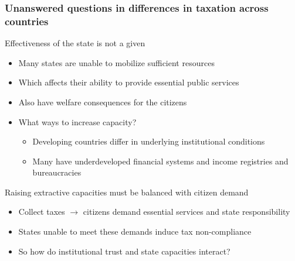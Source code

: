 \documentclass[aspectratio=169]{beamer}
\begin{document}
\begin{frame}
\frametitle{Unanswered questions in differences in taxation across countries}
Effectiveness of the state is not a given
\begin{itemize}\setlength\itemsep{3pt}
\item Many states are unable to mobilize sufficient resources
\item Which affects their ability to provide essential public services
\item Also have welfare consequences for the citizens
\item What ways to increase capacity?
\begin{itemize}\setlength\itemsep{3pt}
\item Developing countries differ in underlying institutional conditions
\item Many have underdeveloped financial systems and income registries and bureaucracies
\end{itemize}
\end{itemize}\medskip
Raising extractive capacities must be balanced with citizen demand
\begin{itemize}\setlength\itemsep{3pt}
\item Collect taxes $\to$ citizens demand essential services and state responsibility
\item States unable to meet these demands induce tax non-compliance 
\item So how do institutional trust and state capacities interact?
\end{itemize}\end{frame}
 
\end{document}
